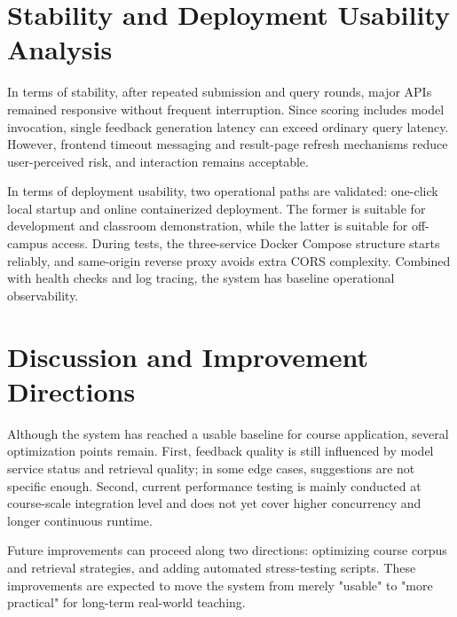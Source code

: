 \section{Stability and Deployment Usability Analysis}

In terms of stability, after repeated submission and query rounds, major APIs remained responsive without frequent interruption. Since scoring includes model invocation, single feedback generation latency can exceed ordinary query latency. However, frontend timeout messaging and result-page refresh mechanisms reduce user-perceived risk, and interaction remains acceptable.

In terms of deployment usability, two operational paths are validated: one-click local startup and online containerized deployment. The former is suitable for development and classroom demonstration, while the latter is suitable for off-campus access. During tests, the three-service Docker Compose structure starts reliably, and same-origin reverse proxy avoids extra CORS complexity. Combined with health checks and log tracing, the system has baseline operational observability.

\section{Discussion and Improvement Directions}

Although the system has reached a usable baseline for course application, several optimization points remain. First, feedback quality is still influenced by model service status and retrieval quality; in some edge cases, suggestions are not specific enough. Second, current performance testing is mainly conducted at course-scale integration level and does not yet cover higher concurrency and longer continuous runtime.

Future improvements can proceed along two directions: optimizing course corpus and retrieval strategies, and adding automated stress-testing scripts. These improvements are expected to move the system from merely "usable" to "more practical" for long-term real-world teaching.

